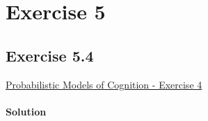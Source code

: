 \section*{Exercise 5}

\subsection*{Exercise 5.4}
\href{http://v1.probmods.org/conditioning.html#exercises}{Probabilistic Models of Cognition - Exercise 4}

\paragraph{Solution}
